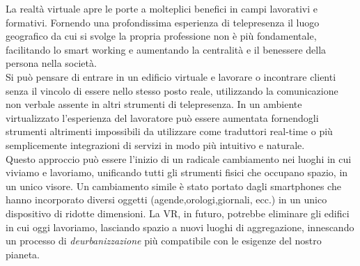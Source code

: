  La realtà virtuale apre le porte a molteplici benefici in campi lavorativi e formativi. Fornendo una profondissima esperienza di telepresenza il luogo geografico da cui si svolge la propria professione non è più fondamentale, facilitando lo smart working e aumentando la centralità e il benessere della persona nella società.\\
 Si può pensare di entrare in un edificio virtuale e lavorare o incontrare clienti senza il vincolo di essere nello stesso posto reale, utilizzando la comunicazione non verbale assente in altri strumenti di telepresenza. In un ambiente virtualizzato l'esperienza del lavoratore può essere aumentata fornendogli strumenti altrimenti impossibili da utilizzare come traduttori real-time o più semplicemente integrazioni di servizi in modo più intuitivo e naturale. \\
 Questo approccio può essere l'inizio di un radicale cambiamento nei luoghi in cui viviamo e lavoriamo, unificando tutti gli strumenti fisici che occupano spazio, in un unico visore. Un cambiamento simile è stato portato dagli smartphones che hanno incorporato diversi oggetti (agende,orologi,giornali, ecc.) in un unico dispositivo di ridotte dimensioni. La VR, in futuro, potrebbe eliminare gli edifici in cui oggi lavoriamo, lasciando spazio a nuovi luoghi di aggregazione, innescando un processo di \textit{deurbanizzazione} più compatibile con le esigenze del nostro pianeta. \\ 
 
